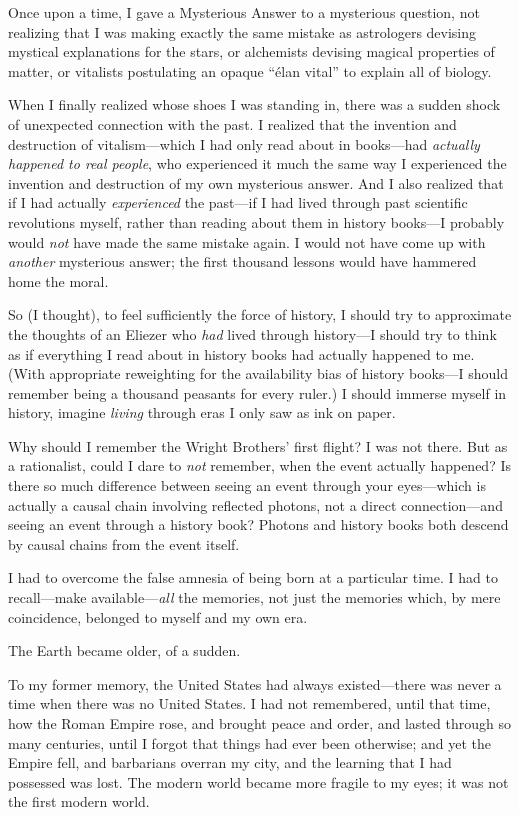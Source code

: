 {
 Once upon a time, I gave a Mysterious Answer to a mysterious
question, not realizing that I was making exactly the same mistake as
astrologers devising mystical explanations for the stars, or alchemists
devising magical properties of matter, or vitalists postulating an
opaque ``élan vital'' to explain all
of biology.}

{
 When I finally realized whose shoes I was standing in, there was a
sudden shock of unexpected connection with the past. I realized that
the invention and destruction of vitalism---which I had only read about
in books---had \textit{actually happened to real people}, who
experienced it much the same way I experienced the invention and
destruction of my own mysterious answer. And I also realized that if I
had actually \textit{experienced} the past---if I had lived through
past scientific revolutions myself, rather than reading about them in
history books---I probably would \textit{not} have made the same
mistake again. I would not have come up with \textit{another}
mysterious answer; the first thousand lessons would have hammered home
the moral.}

{
 So (I thought), to feel sufficiently the force of history, I
should try to approximate the thoughts of an Eliezer who \textit{had}
lived through history---I should try to think as if everything I read
about in history books had actually happened to me. (With appropriate
reweighting for the availability bias of history books---I should
remember being a thousand peasants for every ruler.) I should immerse
myself in history, imagine \textit{living} through eras I only saw as
ink on paper.}

{
 Why should I remember the Wright Brothers' first
flight? I was not there. But as a rationalist, could I dare to
\textit{not} remember, when the event actually happened? Is there so
much difference between seeing an event through your eyes---which is
actually a causal chain involving reflected photons, not a direct
connection---and seeing an event through a history book? Photons and
history books both descend by causal chains from the event itself.}

{
 I had to overcome the false amnesia of being born at a particular
time. I had to recall---make available---\textit{all} the memories, not
just the memories which, by mere coincidence, belonged to myself and my
own era.}

{
 The Earth became older, of a sudden.}

{
 To my former memory, the United States had always existed---there
was never a time when there was no United States. I had not remembered,
until that time, how the Roman Empire rose, and brought peace and
order, and lasted through so many centuries, until I forgot that things
had ever been otherwise; and yet the Empire fell, and barbarians
overran my city, and the learning that I had possessed was lost. The
modern world became more fragile to my eyes; it was not the first
modern world.}

